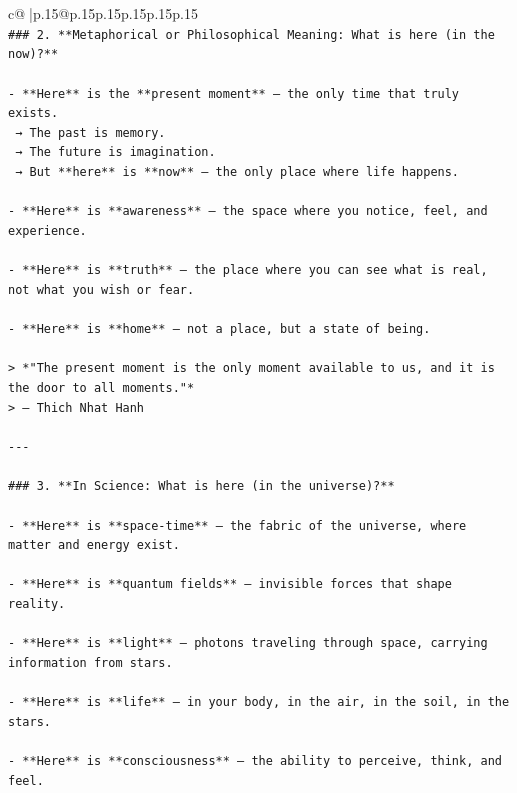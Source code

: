 \documentclass{article}
\begin{document}
{\begin{supertabular}{c@{$\;$}|p{.15\linewidth}@{}p{.15\linewidth}p{.15\linewidth}p{.15\linewidth}p{.15\linewidth}p{.15\linewidth}}
{{{\\ 
\texttt{\#\#\# 2. **Metaphorical or Philosophical Meaning: What is here (in the now)?**} \\
\\ 
\texttt{{-} **Here** is the **present moment** — the only time that truly exists.  } \\
\texttt{  → The past is memory.  } \\
\texttt{  → The future is imagination.  } \\
\texttt{  → But **here** is **now** — the only place where life happens.} \\
\\ 
\texttt{{-} **Here** is **awareness** — the space where you notice, feel, and experience.} \\
\\ 
\texttt{{-} **Here** is **truth** — the place where you can see what is real, not what you wish or fear.} \\
\\ 
\texttt{{-} **Here** is **home** — not a place, but a state of being.} \\
\\ 
\texttt{> *"The present moment is the only moment available to us, and it is the door to all moments."*  } \\
\texttt{> — Thich Nhat Hanh} \\
\\ 
\texttt{{-}{-}{-}} \\
\\ 
\texttt{\#\#\# 3. **In Science: What is here (in the universe)?**} \\
\\ 
\texttt{{-} **Here** is **space{-}time** — the fabric of the universe, where matter and energy exist.} \\
\\ 
\texttt{{-} **Here** is **quantum fields** — invisible forces that shape reality.} \\
\\ 
\texttt{{-} **Here** is **light** — photons traveling through space, carrying information from stars.} \\
\\ 
\texttt{{-} **Here** is **life** — in your body, in the air, in the soil, in the stars.} \\
\\ 
\texttt{{-} **Here** is **consciousness** — the ability to perceive, think, and feel.} \\
\\ 
}}}
\end{supertabular}}
\end{document}
